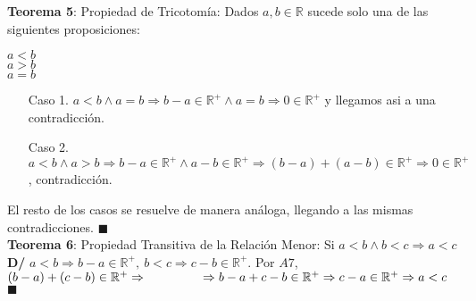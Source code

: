 \documentclass[11pt,a4paper]{article}
\newcommand*{\QEDA}{\null\nobreak\hfill\ensuremath{\blacksquare}}
\begin{document}
\noindent \textbf{Teorema 5}: Propiedad de Tricotom\'ia: Dados $a,b \in \mathbb{R}$ sucede solo una de las siguientes proposiciones:
\begin{multicols}{3}
$a < b$\\
$a > b$\\
$a = b$
\end{multicols}
\begin{enumerate}
\item [Caso 1. ] $a < b \land a = b \Rightarrow b - a \in \mathbb{R}^+ \land a = b \Rightarrow 0 \in \mathbb{R}^+$ y llegamos asi a una contradicci\'on.
\item [Caso 2. ] $a < b \land a > b \Rightarrow b - a \in \mathbb{R}^+ \land a - b \in \mathbb{R}^+ \Rightarrow (b-a)+(a-b) \in \mathbb{R}^+ \Rightarrow 0 \in \mathbb{R}^+$, contradicci\'on.
\end{enumerate} 
El resto de los casos se resuelve de manera an\'aloga, llegando a las mismas contradicciones. \QEDA\\

\noindent \textbf{Teorema 6}: Propiedad Transitiva de la Relaci\'on Menor: Si $a < b \land b < c \Rightarrow a < c$ \\
\textbf{D/} $a < b \Rightarrow b-a \in \mathbb{R}^+,\ b < c \Rightarrow c - b \in \mathbb{R}^+$. Por $A7$, $(b-a)+(c-b) \in \mathbb{R}^+\Rightarrow \\ \indent \ \ \ \ \ \ \ \ \Rightarrow b-a+c-b \in \mathbb{R}^+ \Rightarrow c-a \in \mathbb{R}^+ \Rightarrow a < c$ \QEDA\\
\end{document}
